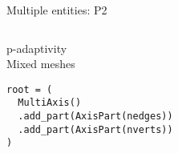 \documentclass{beamer}
\newcommand{\checked}{\makebox[0pt][l]{$\square$}\raisebox{.15ex}{\hspace{0.1em}$\checkmark$}}
\begin{document}
\begin{frame}[fragile]{Multiple entities: P2}
\begin{columns}
    \hfill

    \begin{column}{.5\textwidth}
      \checked p-adaptivity \\
      \checked Mixed meshes

      \vspace{2em}

      \begin{verbatim}
root = (
  MultiAxis()
  .add_part(AxisPart(nedges))
  .add_part(AxisPart(nverts))
)
      \end{verbatim}
    \end{column}
  \end{columns}
\end{frame}
\end{document}
